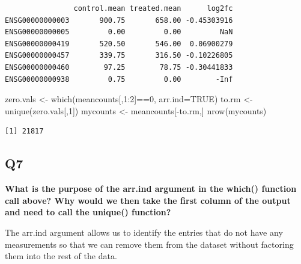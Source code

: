 \documentclass[
  letterpaper,
  DIV=11,
  numbers=noendperiod]{scrartcl}
\newenvironment{Shaded}{\begin{snugshade}}{\end{snugshade}}
\newcommand{\AttributeTok}[1]{\textcolor[rgb]{0.40,0.45,0.13}{#1}}
\newcommand{\ConstantTok}[1]{\textcolor[rgb]{0.56,0.35,0.01}{#1}}
\newcommand{\DecValTok}[1]{\textcolor[rgb]{0.68,0.00,0.00}{#1}}
\newcommand{\FunctionTok}[1]{\textcolor[rgb]{0.28,0.35,0.67}{#1}}
\newcommand{\NormalTok}[1]{\textcolor[rgb]{0.00,0.23,0.31}{#1}}
\newcommand{\OtherTok}[1]{\textcolor[rgb]{0.00,0.23,0.31}{#1}}
\newcommand{\SpecialCharTok}[1]{\textcolor[rgb]{0.37,0.37,0.37}{#1}}
\begin{document}
\begin{verbatim}
                control.mean treated.mean      log2fc
ENSG00000000003       900.75       658.00 -0.45303916
ENSG00000000005         0.00         0.00         NaN
ENSG00000000419       520.50       546.00  0.06900279
ENSG00000000457       339.75       316.50 -0.10226805
ENSG00000000460        97.25        78.75 -0.30441833
ENSG00000000938         0.75         0.00        -Inf
\end{verbatim}

\begin{Shaded}
\begin{Highlighting}[]
\NormalTok{zero.vals }\OtherTok{\textless{}{-}} \FunctionTok{which}\NormalTok{(meancounts[,}\DecValTok{1}\SpecialCharTok{:}\DecValTok{2}\NormalTok{]}\SpecialCharTok{==}\DecValTok{0}\NormalTok{, }\AttributeTok{arr.ind=}\ConstantTok{TRUE}\NormalTok{)}
\NormalTok{to.rm }\OtherTok{\textless{}{-}} \FunctionTok{unique}\NormalTok{(zero.vals[,}\DecValTok{1}\NormalTok{])}
\NormalTok{mycounts }\OtherTok{\textless{}{-}}\NormalTok{ meancounts[}\SpecialCharTok{{-}}\NormalTok{to.rm,]}
\FunctionTok{nrow}\NormalTok{(mycounts)}
\end{Highlighting}
\end{Shaded}

\begin{verbatim}
[1] 21817
\end{verbatim}

\hypertarget{q7}{%
\subsection{\texorpdfstring{\textbf{Q7}}{Q7}}\label{q7}}

\textbf{What is the purpose of the arr.ind argument in the which()
function call above? Why would we then take the first column of the
output and need to call the unique() function?}

The arr.ind argument allows us to identify the entries that do not have
any measurements so that we can remove them from the dataset without
factoring them into the rest of the data.

\begin{Shaded}
\end{Shaded}
\end{document}
